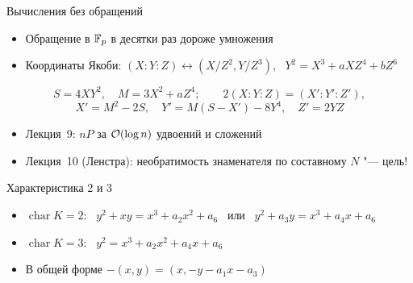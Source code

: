\documentclass{ca-slides}
\begin{document}
\begin{canvasframe}{Вычисления без обращений}
  \begin{itemize}
    \item Обращение в $\mathbb{F}_{p}$ в десятки раз дороже умножения
    \item Координаты Якоби: $(X : Y : Z) \leftrightarrow (X/Z^2, Y/Z^3)$, \
      $Y^2 = X^3 + aXZ^4 + bZ^6$
  \end{itemize}
  \[
    S = 4XY^2,\quad M = 3X^2 + aZ^4;\qquad 2(X : Y : Z) = (X' : Y' : Z'),
  \]
  \[
    X' = M^2 - 2S,\quad Y' = M(S - X') - 8Y^4,\quad Z' = 2YZ
  \]
  \begin{itemize}
    \item Лекция~9: $nP$ за $\mathcal{O}(\log n)$ удвоений и сложений
    \item Лекция~10 (Ленстра): необратимость знаменателя по составному $N$ "--- цель!
  \end{itemize}
  \penspace[0.1\textheight]
\end{canvasframe}

\begin{canvasframe}{Характеристика 2 и 3}
  \begin{itemize}
    \item $\operatorname{char} K = 2$: \ $y^2 + xy = x^3 + a_2 x^2 + a_6$ \ или \
      $y^2 + a_3 y = x^3 + a_4 x + a_6$
    \item $\operatorname{char} K = 3$: \ $y^2 = x^3 + a_2 x^2 + a_4 x + a_6$
    \item В общей форме $-(x, y) = (x, -y - a_1 x - a_3)$
  \end{itemize}
  \penspace[0.2\textheight]
\end{canvasframe}
\end{document}
